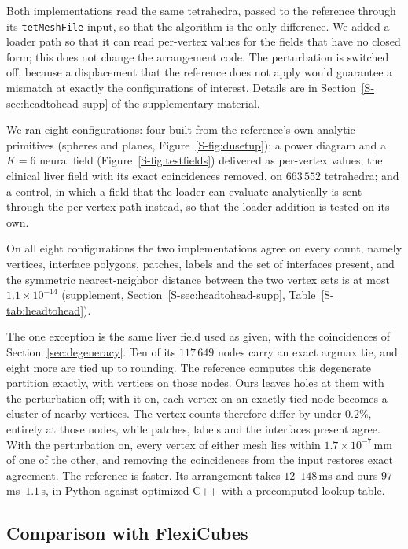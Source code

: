 \documentclass{egpubl}
\newcommand{\sref}[1]{\ref*{S-#1}}
\newcommand{\supp}[1]{Section~\sref{#1} of the supplementary material}
\newcommand{\suppp}[1]{supplement, Section~\sref{#1}}
\theoremstyle{definition}
\begin{document}
Both implementations read the same tetrahedra, passed to the reference
through its \texttt{tetMeshFile} input, so that the algorithm is the only
difference. We added a loader path so that it can read per-vertex values for
the fields that have no closed form; this does not change the arrangement
code. The
perturbation is switched off, because a displacement that the
reference does not apply would guarantee a mismatch at exactly the
configurations of interest. Details are in \supp{sec:headtohead-supp}.

We ran eight configurations: four built from the reference's own analytic primitives
(spheres and planes, Figure~\sref{fig:dusetup}); a power diagram and a $K=6$ neural field
(Figure~\sref{fig:testfields}) delivered as per-vertex values; the clinical liver field with its exact coincidences
removed, on $663\,552$ tetrahedra; and a control, in which a field that the
loader can evaluate analytically is sent through the per-vertex path instead,
so that the loader addition is tested on its own.

On all eight configurations the two implementations agree on every count, namely vertices, interface polygons,
patches, labels and the set of interfaces present, and the symmetric
nearest-neighbor distance between the two vertex sets is at most $1.1\times10^{-14}$
(\suppp{sec:headtohead-supp}, Table~\sref{tab:headtohead}).

The one exception is the same liver field used as given, with the
coincidences of Section~\ref{sec:degeneracy}. Ten of its $117\,649$ nodes carry
an exact argmax tie, and eight more are tied up to rounding. The reference
computes this degenerate partition exactly, with vertices on those nodes. Ours
leaves holes at them with the perturbation off; with it on, each vertex on an
exactly tied node becomes a cluster of nearby vertices. The vertex counts therefore differ by
under $0.2\%$, entirely at those nodes, while patches, labels and the
interfaces present agree. With the perturbation on, every vertex of either mesh
lies within $1.7\times10^{-7}$\,mm of one of the other, and removing the
coincidences from the input restores exact agreement. The reference is
faster. Its arrangement takes $12$--$148$\,ms and ours $97$\,ms--$1.1$\,s,
in Python against optimized C++ with a precomputed lookup table.

\subsection{Comparison with FlexiCubes}
\label{sec:flexicubes}
\end{document}
